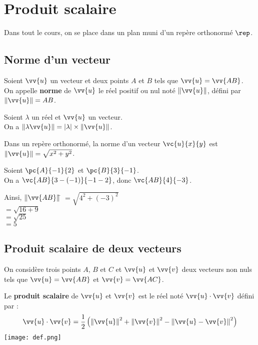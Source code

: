 \documentclass[a4paper,11pt,cours]{nsi} %
\begin{document}
\setcounter{chapter}{8} %



\chapter{Produit scalaire}


Dans tout le cours, on se place dans un plan muni d'un repère orthonormé $\rep$.
\section{Norme d'un vecteur}

\begin{definition}[]
    Soient $\vv{u}$ un vecteur et deux points $A$ et $B$ tels que $\vv{u} = \vv{AB}$.\\
    On appelle \textbf{norme} de $\vv{u}$ le réel positif ou nul noté $\left\|\vv{u}\right\|$, défini par $\left\|\vv{u}\right\| = AB$.
\end{definition}

\begin{propriete}[]
    Soient $\lambda$ un réel et $\vv{u}$ un vecteur.\\
    On a $\left\|\lambda \vv{u}\right\| = \left|\lambda\right| \times \left\|\vv{u}\right\|$.
\end{propriete}

\begin{propriete}[]
    Dans un repère orthonormé, la norme d'un vecteur $\vc{u}{x}{y}$ est $\left\|\vv{u}\right\| = \sqrt{x^2 + y^2}$.
\end{propriete}

\begin{exemple}[]
    Soient $\pc{A}{-1}{2}$ et $\pc{B}{3}{-1}$.\\[.5em]
    On a $\vc{AB}{3-(-1)}{-1-2}$, donc $\vc{AB}{4}{-3}$.
    \begin{tabbing}
         Ainsi, $\left\|\vv{AB}\right\|$\= $= \sqrt{4^2 + (-3)^2}$\\
         \>$ = \sqrt{16 + 9}$\\
         \>$ = \sqrt{25}$\\
         \>$ = 5$
    \end{tabbing}
\end{exemple}
\newpage

\section{Produit scalaire de deux vecteurs}
On considère trois points $A$, $B$ et $C$ et $\vv{u}$ et $\vv{v}$ deux vecteurs non nuls tels que $\vv{u} = \vv{AB}$ et $\vv{v} = \vv{AC}$.\
\begin{definition}[]
    Le \textbf{produit scalaire} de $\vv{u}$ et $\vv{v}$ est le réel noté $\vv{u} \cdot \vv{v}$ défini par :
        $$\vv{u} \cdot \vv{v} = \dfrac{1}{2}\left(\left\|\vv{u}\right\|^2+\left\|\vv{v}\right\|^2-\left\|\vv{u}-\vv{v}\right\|^2\right)$$
    \texttt{[image: def.png]}
\end{definition}
\end{document}
